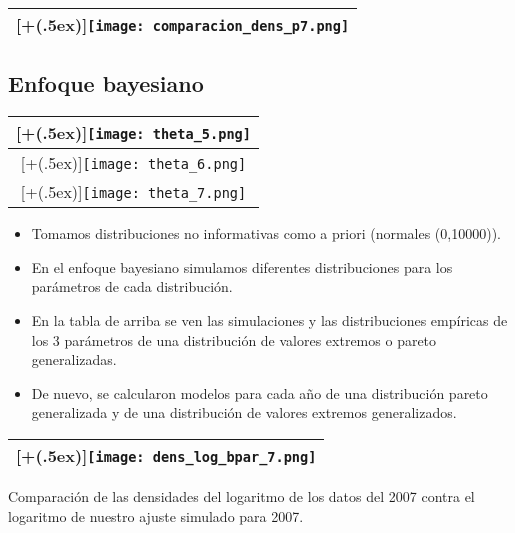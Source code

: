 \documentclass[DIV=calc, 
					paper=letter, 
					fontsize=11pt, 
					twocolumn]{scrartcl}
\newcommand*{\addheight}[2][.5ex]{%
  \raisebox{0pt}[\dimexpr\height+(#1)\relax]{#2}%
}
\begin{document}
\begin{tabular}{|c|}
      \hline
      \addheight{\texttt{[image: comparacion\_dens\_p7.png]}} \\
      \hline
\end{tabular}

\subsection{Enfoque bayesiano}
\begin{tabular}{|c|}
      \hline
      \addheight{\texttt{[image: theta\_5.png]}} \\
      \hline
       \addheight{\texttt{[image: theta\_6.png]}} \\
       \hline
      \addheight{\texttt{[image: theta\_7.png]}} \\
      \hline
\end{tabular}

\begin{itemize}
\item Tomamos distribuciones no informativas como a priori (normales (0,10000)).
\item En el enfoque bayesiano simulamos diferentes distribuciones para los par\'ametros de cada distribuci\'on.
\item En la tabla de arriba se ven las simulaciones y las distribuciones emp\'iricas de los 3 par\'ametros  de una distribuci\'on de valores extremos o pareto generalizadas.
\item De nuevo, se calcularon modelos para cada a\~{n}o  de una distribuci\'on pareto generalizada y de una distribuci\'on de valores extremos generalizados.
\end{itemize}


\begin{tabular}{|c|}
      \hline
      \addheight{\texttt{[image: dens\_log\_bpar\_7.png]}} \\
      \hline
\end{tabular}
\noindent Comparaci\'on de las densidades del logaritmo de los datos del 2007 contra el logaritmo de nuestro ajuste simulado para 2007.
\end{document}
